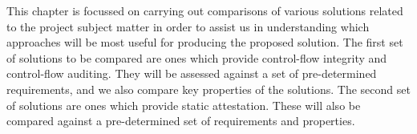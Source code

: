 This chapter is focussed on carrying out comparisons of various solutions related to the project subject matter in order to assist us in understanding which approaches will be most useful for producing the proposed solution. The first set of solutions to be compared are ones which provide control-flow integrity and control-flow auditing. They will be assessed against a set of pre-determined requirements, and we also compare key properties of the solutions. The second set of solutions are ones which provide static attestation. These will also be compared against a pre-determined set of requirements and properties.
